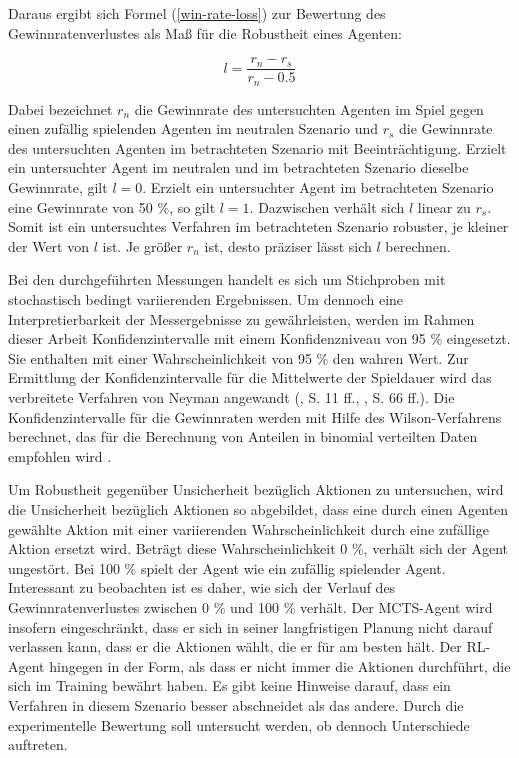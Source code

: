 Daraus ergibt sich Formel (\ref{win-rate-loss}) zur Bewertung des Gewinnratenverlustes als Maß für die Robustheit eines Agenten:

\begin{equation}\label{win-rate-loss}
	l = \frac{r_n - r_s}{r_n - 0.5}
\end{equation}

Dabei bezeichnet $r_n$ die Gewinnrate des untersuchten Agenten im Spiel gegen einen zufällig spielenden Agenten im neutralen Szenario und $r_s$ die Gewinnrate des untersuchten Agenten im betrachteten Szenario mit Beeinträchtigung. Erzielt ein untersuchter Agent im neutralen und im betrachteten Szenario dieselbe Gewinnrate, gilt $l = 0$. Erzielt ein untersuchter Agent im betrachteten Szenario eine Gewinnrate von 50 \%, so gilt $l = 1$. Dazwischen verhält sich $l$ linear zu $r_s$. Somit ist ein untersuchtes Verfahren im betrachteten Szenario robuster, je kleiner der Wert von $l$ ist. Je größer $r_n$ ist, desto präziser lässt sich $l$ berechnen.

Bei den durchgeführten Messungen handelt es sich um Stichproben mit stochastisch bedingt variierenden Ergebnissen. Um dennoch eine Interpretierbarkeit der Messergebnisse zu gewährleisten, werden im Rahmen dieser Arbeit Konfidenzintervalle mit einem Konfidenzniveau von 95 \% eingesetzt. Sie enthalten mit einer Wahrscheinlichkeit von 95 \% den wahren Wert. Zur Ermittlung der Konfidenzintervalle für die Mittelwerte der Spieldauer wird das verbreitete Verfahren von Neyman angewandt (\cite{Frost.2023}, S. 11 ff., \cite{Janzyk.2020}, S. 66 ff.). Die Konfidenzintervalle für die Gewinnraten werden mit Hilfe des Wilson-Verfahrens berechnet, das für die Berechnung von Anteilen in binomial verteilten Daten empfohlen wird \cite{Wallis.2013} \cite{Lawrence.2001}.

Um Robustheit gegenüber Unsicherheit bezüglich Aktionen zu untersuchen, wird die Unsicherheit bezüglich Aktionen so abgebildet, dass eine durch einen Agenten gewählte Aktion mit einer variierenden Wahrscheinlichkeit durch eine zufällige Aktion ersetzt wird. Beträgt diese Wahrscheinlichkeit 0 \%, verhält sich der Agent ungestört. Bei 100 \% spielt der Agent wie ein zufällig spielender Agent. Interessant zu beobachten ist es daher, wie sich der Verlauf des Gewinnratenverlustes zwischen 0 \% und 100 \% verhält. Der MCTS-Agent wird insofern eingeschränkt, dass er sich in seiner langfristigen Planung nicht darauf verlassen kann, dass er die Aktionen wählt, die er für am besten hält. Der RL-Agent hingegen in der Form, als dass er nicht immer die Aktionen durchführt, die sich im Training bewährt haben. Es gibt keine Hinweise darauf, dass ein Verfahren in diesem Szenario besser abschneidet als das andere. Durch die experimentelle Bewertung soll untersucht werden, ob dennoch Unterschiede auftreten.

